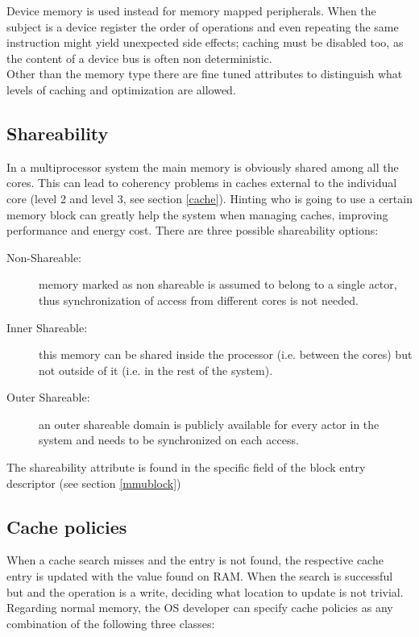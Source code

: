 \documentclass[12pt,a4paper,openright,twoside]{report}
\begin{document}
Device memory is used instead for memory mapped peripherals. When the subject is
a device register the order of operations and even repeating the same instruction
might yield unexpected side effects; caching must be disabled too, as the content
of a device bus is often non deterministic.\\
Other than the memory type there are fine tuned attributes to distinguish
what levels of caching and optimization are allowed.

\subsection{Shareability}
In a multiprocessor system the main memory is obviously shared among all the cores.
This can lead to coherency problems in caches external to the individual core (level 2
and level 3, see section \ref{cache}). Hinting who is going to use a certain memory
block can greatly help the system when managing caches, improving performance
and energy cost. There are three possible
shareability options:
\begin{description}
    \item[Non-Shareable:] memory marked as non shareable is assumed to belong to
        a single actor, thus synchronization of access from different cores is 
        not needed.
    \item[Inner Shareable:] this memory can be shared inside the processor (i.e. 
        between the cores) but not outside of it (i.e. in the rest of the system).
    \item[Outer Shareable:] an outer shareable domain is publicly available for 
        every actor in the system and needs to be synchronized on each access.
\end{description}
The shareability attribute is found in the specific field of the block entry descriptor
(see section \ref{mmublock})

\newpage

\subsection{Cache policies}
When a cache search misses and the entry is not found, the respective cache entry is 
updated with the value found on RAM. When the search is successful but and the
operation is a write, deciding what location to update is not trivial. \\
Regarding normal memory, the OS developer can specify cache policies as any combination
of the following three classes:
\end{document}
